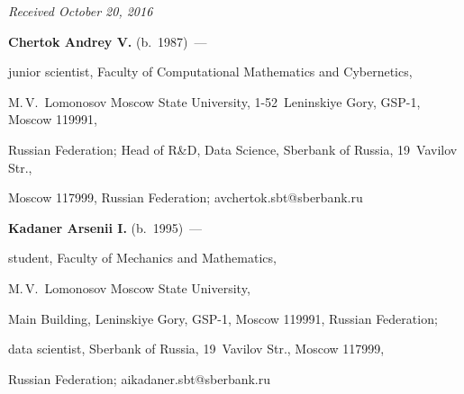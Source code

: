 \vspace*{-6pt}





\hfill{\small\textit{Received October 20, 2016}}





\vspace*{-18pt}





\Contr





\vspace*{-2pt}





\noindent


\textbf{Chertok Andrey V.} (b.\ 1987)~--- 


junior scientist, Faculty of Computational Mathematics and Cybernetics, 


M.\,V.~Lo\-monosov Moscow State University, 1-52~Leninskiye Gory, GSP-1, Moscow 119991, 


Russian Federation; Head of R\&D, Data Science, Sberbank of Russia, 19~Vavilov Str.,


Moscow 117999, Russian Federation; \mbox{avchertok.sbt@sberbank.ru}





 \vspace*{1pt}


 


\noindent


\textbf{Kadaner Arsenii I.} (b.\ 1995)~--- 


student, Faculty of Mechanics and Mathematics, 


M.\,V.~Lomonosov Moscow State University, 


Main Building, Leninskiye Gory, GSP-1, Moscow 119991, Russian Federation; 


data scientist, Sberbank of Russia, 19~Vavilov Str., Moscow 117999, 


Russian Federation; \mbox{aikadaner.sbt@sberbank.ru}





  \vspace*{1pt}


 


